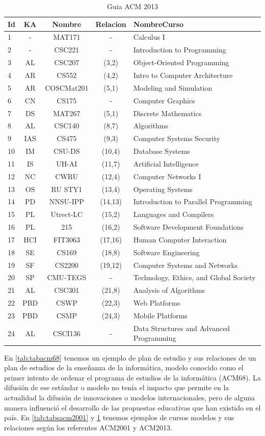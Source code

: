 \begin{table}[!ht]
\centering
\caption{Guia ACM 2013}
\begin{tabular}[t]{lcccl}
\hline
Id&KA&Nombre&Relacion&NombreCurso\\
\hline
1&-	&MAT171&-&Calculus I\\
2&-	&CSC221&-&Introduction to Programming\\
3&AL&CSC207&(3,2)&Object-Oriented Programming\\
4&AR&CS552&(4,2)&Intro to Computer Architecture\\
5&AR&COSCMat201&(5,1)&Modeling and Simulation\\
6&CN&CS175&-&Computer Graphics\\
7&DS&MAT267&(5,1)&Discrete Mathematics\\
8&AL&CSC140&(8,7)&Algorithms\\
9&IAS&CS475&(9,3)&Computer Systems Security\\
10&IM&CSU-DS&(10,4)&Database Systems\\
11&IS&UH-AI&(11,7)&Artificial Intelligence\\
12&NC&CWRU&(12,4)&Computer Networks I\\
13&OS&RU STY1&(13,4)&Operating Systems\\
14&PD&NNSU-IPP&(14,13)&Introduction to Parallel Programming\\
15&PL&Utrect-LC&(15,2)&Languages and Compilers\\
16&PL&215&(16,2)&Software Development Foundations\\
17&HCI&FIT3063&(17,16)&Human Computer Interaction\\
18&SE&CS169&(18,8)&Software Engineering\\
19&SF&CS2200&(19,12)&Computer Systems and Networks\\
20&SP&CMU-TEGS&-&Technology, Ethics, and Global Society\\
21&AL&CSC301&(21,8)&Analysis of Algorithms\\
22&PBD&CSWP&(22,3)&Web Platforms\\
23&PBD&CSMP&(24,3)&Mobile Platforms\\
24&AL&CSCI136&-&Data Structures and Advanced Programming\\
\hline
\end{tabular}
\label{tab:tabsacm2013}
\end{table}

\newpage

En  \ref{tab:tabacm68} tenemos un ejemplo de plan de estudio y sus relaciones de un plan de estudios de la enseñanza de la informática, modelo conocido como el primer intento de ordenar el programa de estudios de la informática (ACM68). La difusión de ese estándar o modelo no tenía el impacto que permite en la actualidad la difusión de innovaciones o modelos internacionales, pero de alguna manera influenció el desarrollo de las propuestas educativas que han existido en el país. En \ref{tab:tabsacm2001} y \ref{tab:tabsacm2013} tenemos ejemplos de cursos modelos y sus relaciones según los referentes ACM2001 y ACM2013. 

